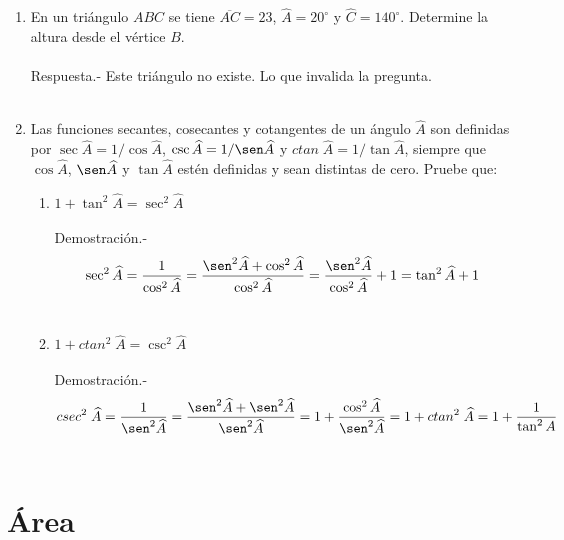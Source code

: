 \documentclass[10pt]{article}
\begin{document}
\begin{enumerate}
    \item En un triángulo $ABC$ se tiene $\overline{AC} = 23$, $\widehat{A} = 20^\circ$ y $\widehat{C} = 140^\circ$. Determine la altura desde el vértice $B$.\\\\
	Respuesta.-\; Este triángulo no existe. Lo que invalida la pregunta. \\\\

    \item Las funciones secantes, cosecantes y cotangentes de un ángulo $\widehat{A}$ son definidas por $\sec \widehat{A}=1/\cos \widehat{A}$, $\csc \widehat{A}=1/\sen \widehat{A}$ y $ctan \; \widehat{A}=1/\tan \widehat{A}$, siempre que $\cos \widehat{A}$, $\sen \widehat{A}$ y $\tan \widehat{A}$ estén definidas y sean distintas de cero. Pruebe que:
	\begin{enumerate}[\bfseries a)]
	    \item $1+\tan^2 \widehat{A} = \sec^2 \widehat{A}$\\\\
		Demostración.-\; $$\sec^2 \widehat{A}=\dfrac{1}{\cos^2 \widehat{A}} = \dfrac{\sen^2 \widehat{A} + \cos^2 \widehat{A}}{\cos^2 \widehat{A}} = \dfrac{\sen^2 \widehat{A}}{\cos^2 \widehat{A}} + 1 = \tan^2 \widehat{A} + 1$$\\

	    \item $1+ctan^2 \; \widehat{A}=\csc^2 \widehat{A}$\\\\
		Demostración.-\; $$csec^2 \;\widehat{A} =\dfrac{1}{\sen^2 \widehat{A}} = \dfrac{\sen^2\widehat{A} + \sen^2 \widehat{A}}{\sen^2 \widehat{A}} = 1+ \dfrac{\cos^2 \widehat{A}}{\sen^2\widehat{A}} = 1 + ctan^2 \; \widehat{A} = 1 + \dfrac{1}{\tan^2 A}$$\\
	\end{enumerate}

\end{enumerate}



\section*{Área}
\end{document}
